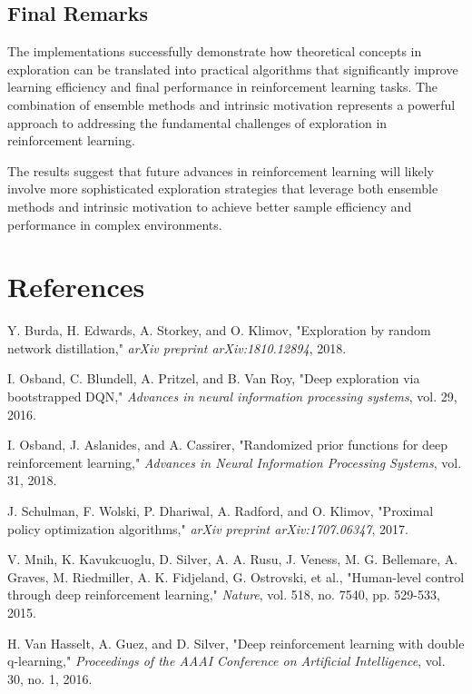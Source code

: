 \documentclass[12pt]{article}
\begin{document}
{{{\subsection{Final Remarks}

The implementations successfully demonstrate how theoretical concepts in exploration can be translated into practical algorithms that significantly improve learning efficiency and final performance in reinforcement learning tasks. The combination of ensemble methods and intrinsic motivation represents a powerful approach to addressing the fundamental challenges of exploration in reinforcement learning.

The results suggest that future advances in reinforcement learning will likely involve more sophisticated exploration strategies that leverage both ensemble methods and intrinsic motivation to achieve better sample efficiency and performance in complex environments.

\section{References}

\begin{thebibliography}{9}

Y. Burda, H. Edwards, A. Storkey, and O. Klimov, "Exploration by random network distillation," \textit{arXiv preprint arXiv:1810.12894}, 2018.

I. Osband, C. Blundell, A. Pritzel, and B. Van Roy, "Deep exploration via bootstrapped DQN," \textit{Advances in neural information processing systems}, vol. 29, 2016.

I. Osband, J. Aslanides, and A. Cassirer, "Randomized prior functions for deep reinforcement learning," \textit{Advances in Neural Information Processing Systems}, vol. 31, 2018.

J. Schulman, F. Wolski, P. Dhariwal, A. Radford, and O. Klimov, "Proximal policy optimization algorithms," \textit{arXiv preprint arXiv:1707.06347}, 2017.

V. Mnih, K. Kavukcuoglu, D. Silver, A. A. Rusu, J. Veness, M. G. Bellemare, A. Graves, M. Riedmiller, A. K. Fidjeland, G. Ostrovski, et al., "Human-level control through deep reinforcement learning," \textit{Nature}, vol. 518, no. 7540, pp. 529-533, 2015.

H. Van Hasselt, A. Guez, and D. Silver, "Deep reinforcement learning with double q-learning," \textit{Proceedings of the AAAI Conference on Artificial Intelligence}, vol. 30, no. 1, 2016.


\end{thebibliography}}}}
\end{document}
